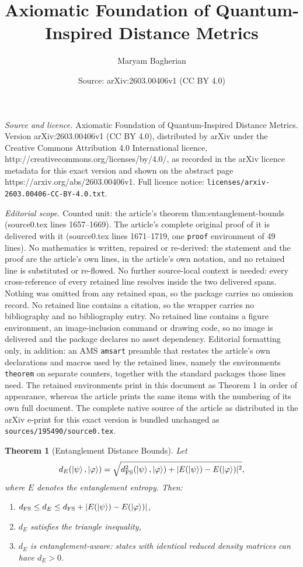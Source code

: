 \documentclass[10pt,a4paper]{amsart}
\title{Axiomatic Foundation of Quantum-Inspired Distance Metrics}
\author{Maryam Bagherian}
\date{Source: arXiv:2603.00406v1 (CC BY 4.0)}
\newtheorem{theorem}{Theorem}
\begin{document}
\maketitle

\noindent\emph{Source and licence.} Axiomatic Foundation of Quantum-Inspired Distance Metrics. Version arXiv:2603.00406v1 (CC BY 4.0), distributed by arXiv under the Creative Commons Attribution 4.0 International licence, http://creativecommons.org/licenses/by/4.0/, as recorded in the arXiv licence metadata for this exact version and shown on the abstract page https://arxiv.org/abs/2603.00406v1. Full licence notice: \texttt{licenses/arxiv-2603.00406-CC-BY-4.0.txt}.\par\smallskip

\noindent\textit{Editorial scope.} Counted unit: the article's theorem thm:entanglement-bounds (source0.tex lines 1657--1669). The article's complete original proof of it is delivered with it (source0.tex lines 1671--1719, one \texttt{proof} environment of 49 lines). No mathematics is written, repaired or re-derived: the statement and the proof are the article's own lines, in the article's own notation, and no retained line is substituted or re-flowed.  No further source-local context is needed: every cross-reference of every retained line resolves inside the two delivered spans.  Nothing was omitted from any retained span, so the package carries no omission record.  No retained line contains a citation, so the wrapper carries no bibliography and no bibliography entry.  No retained line contains a figure environment, an image-inclusion command or drawing code, so no image is delivered and the package declares no asset dependency.  Editorial formatting only, in addition: an AMS \texttt{amsart} preamble that restates the article's own declarations and macros used by the retained lines, namely the environments \texttt{theorem} on separate counters, together with the standard packages those lines need.  The retained environments print in this document as Theorem 1 in order of appearance, whereas the article prints the same items with the numbering of its own full document.  The complete native source of the article as distributed in the arXiv e-print for this exact version is bundled unchanged as \texttt{sources/195490/source0.tex}.
\begin{theorem}[Entanglement Distance Bounds]
\label{thm:entanglement-bounds}
Let 
\[
d_E(\ket{\psi},\ket{\varphi}) = \sqrt{d_{\text{FS}}^2(\ket{\psi},\ket{\varphi}) + |E(\ket{\psi}) - E(\ket{\varphi})|^2},
\] 
where $E$ denotes the entanglement entropy. Then:
\begin{enumerate}[label=(\roman*)]
    \item $d_{\text{FS}} \le d_E \le d_{\text{FS}} + |E(\ket{\psi}) - E(\ket{\varphi})|$,
    \item $d_E$ satisfies the triangle inequality,
    \item $d_E$ is entanglement-aware: states with identical reduced density matrices can have $d_E>0$.
\end{enumerate}
\end{theorem}
\end{document}
